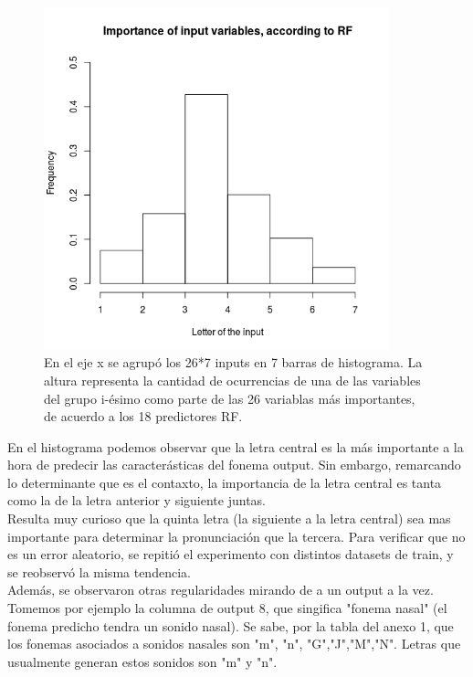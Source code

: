 \documentclass[paper=a4, fontsize=11pt]{scrartcl} %
\numberwithin{equation}{section} %
\numberwithin{figure}{section} %
\numberwithin{table}{section} %
\begin{document}
\begin{figure}[h!]
\centering
\includegraphics[width=100mm]{imgs/variable_importance.jpg}
\caption{En el eje x se agrupó los 26*7 inputs en 7 barras de histograma. La altura representa la cantidad de ocurrencias de una de las variables del grupo i-ésimo como parte de las 26 variablas más importantes, de acuerdo a los 18 predictores RF.}
\label{fig:results}

\end{figure}

En el histograma podemos observar que la letra central es la más importante a la hora de predecir las caracterásticas del fonema output. Sin embargo, remarcando lo determinante que es el contaxto, la importancia de la letra central es tanta como la de la letra anterior y siguiente juntas. \\

Resulta muy curioso que la quinta letra (la siguiente a la letra central) sea mas importante para determinar la pronunciación que la tercera. Para verificar que no es un error aleatorio, se repitió el experimento con distintos datasets de train, y se reobservó la misma tendencia. \\

Además, se observaron otras regularidades mirando de a un output a la vez. Tomemos por ejemplo la columna de output 8, que singifica "fonema nasal" (el fonema predicho tendra un sonido nasal). Se sabe, por la tabla del anexo 1, que los fonemas asociados a sonidos nasales son "m", "n", "G","J","M","N". Letras que usualmente generan estos sonidos son "m" y "n". \\
\end{document}
